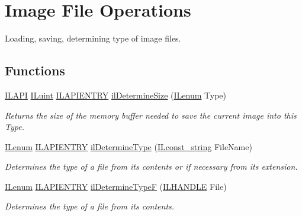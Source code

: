 \hypertarget{group__file}{\section{Image File Operations}
\label{group__file}
}


Loading, saving, determining type of image files.  


\subsection*{Functions}
\begin{DoxyCompactItemize}
\item 
\hyperlink{_i_l_8h_aedb0c8b2b033d0612e3d784d2f598758}{I\+L\+A\+P\+I} \hyperlink{group__il__types_gaff8e86a1072c8d7cfe387fb87c6ed8e1}{I\+Luint} \hyperlink{_i_l_8h_a69c08a8d06df986f7e46f209d131ef2f}{I\+L\+A\+P\+I\+E\+N\+T\+R\+Y} \hyperlink{group__file_ga1a1701a1dbec445a4e184a189707d2cd}{il\+Determine\+Size} (\hyperlink{group__il__types_ga62ca73445716183ef42b1f3906a45ed0}{I\+Lenum} Type)
\begin{DoxyCompactList}\small\item\em Returns the size of the memory buffer needed to save the current image into this Type. \end{DoxyCompactList}\item 
\hyperlink{group__il__types_ga62ca73445716183ef42b1f3906a45ed0}{I\+Lenum} \hyperlink{_i_l_8h_a69c08a8d06df986f7e46f209d131ef2f}{I\+L\+A\+P\+I\+E\+N\+T\+R\+Y} \hyperlink{group__file_ga910c033593bbdb2d6018ecbe2aeab089}{il\+Determine\+Type} (\hyperlink{group__il__types_ga1aa1edc3eb344e14acacb02bade24a5a}{I\+Lconst\+\_\+string} File\+Name)
\begin{DoxyCompactList}\small\item\em Determines the type of a file from its contents or if necessary from its extension. \end{DoxyCompactList}\item 
\hyperlink{group__il__types_ga62ca73445716183ef42b1f3906a45ed0}{I\+Lenum} \hyperlink{_i_l_8h_a69c08a8d06df986f7e46f209d131ef2f}{I\+L\+A\+P\+I\+E\+N\+T\+R\+Y} \hyperlink{group__file_gad4fad086e3c82e04e022254f8e4b8492}{il\+Determine\+Type\+F} (\hyperlink{_i_l_8h_a2e3e6f3fab1fa3764f0802258f702d10}{I\+L\+H\+A\+N\+D\+L\+E} File)
\begin{DoxyCompactList}\small\item\em Determines the type of a file from its contents. \end{DoxyCompactList}\item 

\end{DoxyCompactItemize}
